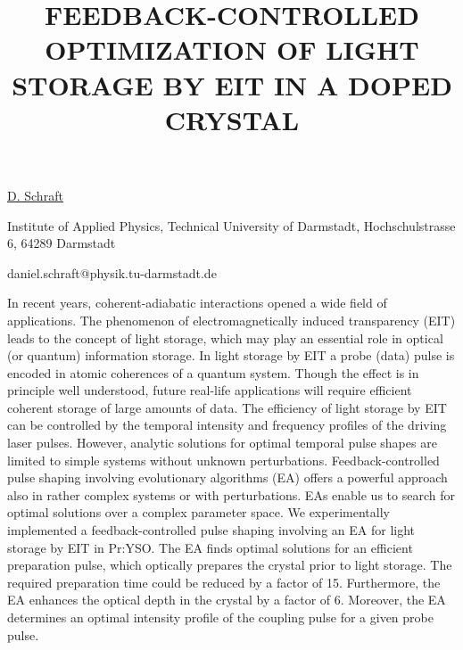 \title{FEEDBACK-CONTROLLED OPTIMIZATION OF LIGHT STORAGE BY EIT IN A DOPED CRYSTAL}

\underline{D. Schraft} 

{\normalsize{\vspace{-4mm}
Institute of Applied Physics, Technical University of Darmstadt, Hochschulstrasse 6, 64289 Darmstadt

\email daniel.schraft@physik.tu-darmstadt.de}}

In recent years, coherent-adiabatic interactions opened a wide field of applications. The phenomenon of electromagnetically induced transparency (EIT) leads to the concept of light storage, which may play an essential role in optical (or quantum) information storage. In light storage by EIT a probe (data) pulse is encoded in atomic coherences of a quantum system. Though the effect is in principle well understood, future real-life applications will require efficient coherent storage of large amounts of data.
The efficiency of light storage by EIT can be controlled by the temporal intensity and frequency profiles of the driving laser pulses. However, analytic solutions for optimal temporal pulse shapes are limited to simple systems without unknown perturbations. Feedback-controlled pulse shaping involving evolutionary algorithms (EA) offers a powerful approach also in rather complex systems or with perturbations. EAs enable us to search for optimal solutions over a complex parameter space.
We experimentally implemented a feedback-controlled pulse shaping involving an EA for light storage by EIT in Pr:YSO. The EA finds optimal solutions for an efficient preparation pulse, which optically prepares the crystal prior to light storage. The required preparation time could be reduced by a factor of 15. Furthermore, the EA enhances the optical depth in the crystal by a factor of 6. Moreover, the EA determines an optimal intensity profile of the coupling pulse for a given probe pulse.

\vspace{\baselineskip} 